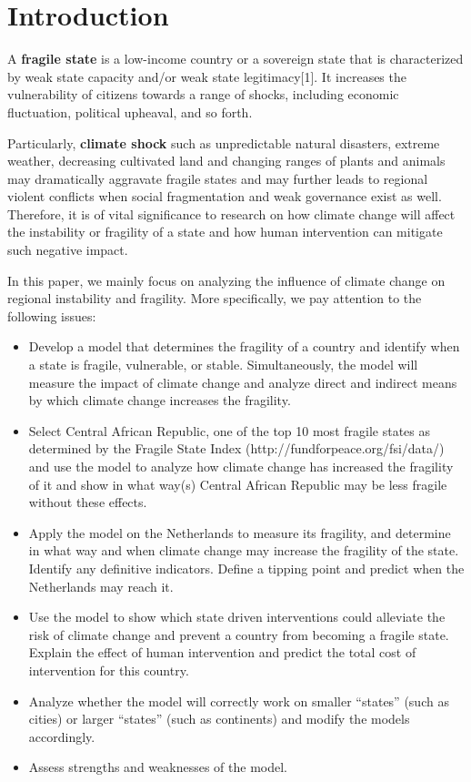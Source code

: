 \documentclass{mcmthesis}
\begin{document}
	
	\newpage
	\begin{center}
		\tableofcontents
	\end{center}
	\newpage
	
	\section{Introduction}
	
	A \textbf{fragile state} is a low-income country or a sovereign state that is characterized by weak state capacity and/or weak state legitimacy[1]. It increases the vulnerability of citizens towards a range of shocks, including economic fluctuation, political upheaval, and so forth. 
	
	Particularly, \textbf{climate shock} such as unpredictable natural disasters, extreme weather, decreasing cultivated land and changing ranges of plants and animals may dramatically aggravate fragile states and may further leads to regional violent conflicts when social fragmentation and weak governance exist as well. Therefore, it is of vital significance to research on how climate change will affect the instability or fragility of a state and how human intervention can mitigate such negative impact.
	
	In this paper, we mainly focus on analyzing the influence of climate change on regional instability and fragility. More specifically, we pay attention to the following issues:
	\begin{itemize}
		\item Develop a model that determines the fragility of a country and identify when a state is fragile, vulnerable, or stable. Simultaneously, the model will measure the impact of climate change and analyze direct and indirect means by which climate change increases the fragility.
		\item Select Central African Republic, one of the top 10 most fragile states as determined by the Fragile State Index (http://fundforpeace.org/fsi/data/) and use the model to analyze how climate change has increased the fragility of it and show in what way(s) Central African Republic may be less fragile without these effects.
		\item Apply the model on the Netherlands to measure its fragility, and determine in what way and when climate change may increase the fragility of the state. Identify any definitive indicators. Define a tipping point and predict when the Netherlands may reach it.
		\item Use the model to show which state driven interventions could alleviate the risk of climate change and prevent a country from becoming a fragile state. Explain the effect of human intervention and predict the total cost of intervention for this country.
		\item Analyze whether the model will correctly work on smaller “states” (such as cities) or larger “states” (such as continents) and modify the models accordingly.
		\item Assess strengths and weaknesses of the model.
	\end{itemize}
	
\end{document}

